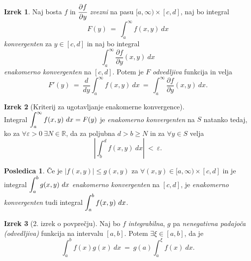 \documentclass[11pt]{article}
\theoremstyle{definition}
\theoremstyle{definition}
\theoremstyle{definition}
\newtheorem{izrek}{Izrek}[section]
\newtheorem*{posledica}{Posledica}
\begin{document}
\begin{izrek}

Naj bosta $f$ in $\cfrac{\partial f}{\partial y}$ \textit{zvezni} na pasu $[a, \infty) \times [c, d]$, naj bo integral
$$F(y) ~=~ \int_a^{\infty} f(x, y)~dx$$
\textit{konvergenten} za $y \in [c, d]$ in naj bo integral
$$\int_a^{\infty} \frac{\partial f}{\partial y}(x, y)~dx$$
\textit{enakomerno konvergenten} na $[c, d]$. Potem je $F$ \textit{odvedljiva} funkcija in velja
$$F'(y) ~=~ \frac{d}{dy} \int_a^{\infty} f(x, y) ~dx ~=~ \int_a^{\infty} \frac{\partial f}{\partial y}(x, y) ~dx.$$

\end{izrek}
\vspace{0.5cm}

\begin{izrek}[Kriterij za ugotavljanje enakomerne konvergence]
~ \\
Integral $\mathlarger{\int_a^{\infty} f(x, y) ~dx} = F(y)$ je \textit{enakomerno konvergenten} na $S$ natanko tedaj, ko za $\forall \varepsilon > 0 ~\exists N \in \mathbb{R}$, da za poljubna $d > b \geq N$ in za $\forall y \in S$ velja
$$\left| \int_b^d f(x, y) ~dx \right| ~<~ \varepsilon.$$

\end{izrek}
\vspace{0.5cm}

\begin{posledica}

Če je $|f(x, y)| \leq g(x, y)$ za $\forall (x, y) \in [a, \infty) \times [c, d]$ in je integral $\mathlarger{\int_a^b g(x, y) ~dx}$ \textit{enakomerno konvergenten} na $[c, d]$, je \textit{enakomerno konvergenten} tudi integral $\mathlarger{\int_a^b f(x, y) ~dx}$.

\end{posledica}
\vspace{0.5cm}

\begin{izrek}[2. izrek o povprečju]

Naj bo $f$ \textit{integrabilna}, $g$ pa \textit{nenegativna padajoča (odvedljiva)} funkcija na intervalu $[a, b]$. Potem $\exists \xi \in [a, b]$, da je
$$\int_a^b f(x) g(x) ~dx ~=~ g(a) \int_a^{\xi} f(x) ~dx.$$

\end{izrek}
\vspace{0.5cm}

\end{document}
